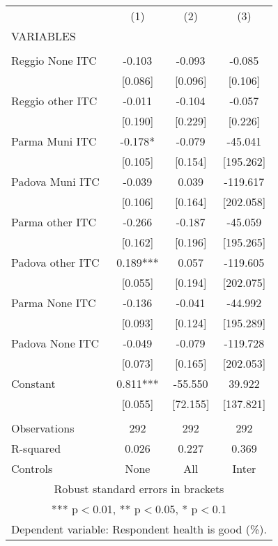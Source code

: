 \begin{tabular}{lccc} \hline
 & (1) & (2) & (3) \\
VARIABLES &  &  &  \\ \hline
 &  &  &  \\
Reggio None ITC & -0.103 & -0.093 & -0.085 \\
 & [0.086] & [0.096] & [0.106] \\
Reggio other ITC & -0.011 & -0.104 & -0.057 \\
 & [0.190] & [0.229] & [0.226] \\
Parma Muni ITC & -0.178* & -0.079 & -45.041 \\
 & [0.105] & [0.154] & [195.262] \\
Padova Muni ITC & -0.039 & 0.039 & -119.617 \\
 & [0.106] & [0.164] & [202.058] \\
Parma other ITC & -0.266 & -0.187 & -45.059 \\
 & [0.162] & [0.196] & [195.265] \\
Padova other ITC & 0.189*** & 0.057 & -119.605 \\
 & [0.055] & [0.194] & [202.075] \\
Parma None ITC & -0.136 & -0.041 & -44.992 \\
 & [0.093] & [0.124] & [195.289] \\
Padova None ITC & -0.049 & -0.079 & -119.728 \\
 & [0.073] & [0.165] & [202.053] \\
Constant & 0.811*** & -55.550 & 39.922 \\
 & [0.055] & [72.155] & [137.821] \\
 &  &  &  \\
Observations & 292 & 292 & 292 \\
R-squared & 0.026 & 0.227 & 0.369 \\
 Controls & None & All & Inter \\ \hline
\multicolumn{4}{c}{ Robust standard errors in brackets} \\
\multicolumn{4}{c}{ *** p$<$0.01, ** p$<$0.05, * p$<$0.1} \\
\multicolumn{4}{c}{ Dependent variable: Respondent health is good (\%).} \\
\end{tabular}
